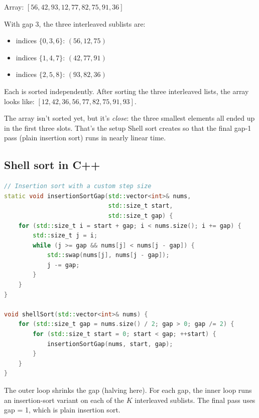 \documentclass[11pt]{article}
\begin{document}
\begin{examplebox}
Array: \quad $[56, 42, 93, 12, 77, 82, 75, 91, 36]$

With gap 3, the three interleaved sublists are:
\begin{itemize}[leftmargin=*]
  \item indices $\{0, 3, 6\}$: $(56, 12, 75)$
  \item indices $\{1, 4, 7\}$: $(42, 77, 91)$
  \item indices $\{2, 5, 8\}$: $(93, 82, 36)$
\end{itemize}
Each is sorted independently. After sorting the three interleaved
lists, the array looks like:
$[12, 42, 36, 56, 77, 82, 75, 91, 93]$.

The array isn't sorted yet, but it's \emph{close}: the three
smallest elements all ended up in the first three slots. That's the
setup Shell sort creates so that the final gap-1 pass (plain
insertion sort) runs in nearly linear time.
\end{examplebox}

\subsection{Shell sort in C++}

\begin{examplebox}
\begin{lstlisting}[basicstyle=\ttfamily\small,frame=single,language=C++]
// Insertion sort with a custom step size
static void insertionSortGap(std::vector<int>& nums,
                             std::size_t start,
                             std::size_t gap) {
    for (std::size_t i = start + gap; i < nums.size(); i += gap) {
        std::size_t j = i;
        while (j >= gap && nums[j] < nums[j - gap]) {
            std::swap(nums[j], nums[j - gap]);
            j -= gap;
        }
    }
}

void shellSort(std::vector<int>& nums) {
    for (std::size_t gap = nums.size() / 2; gap > 0; gap /= 2) {
        for (std::size_t start = 0; start < gap; ++start) {
            insertionSortGap(nums, start, gap);
        }
    }
}
\end{lstlisting}
The outer loop shrinks the gap (halving here). For each gap, the
inner loop runs an insertion-sort variant on each of the $K$
interleaved sublists. The final pass uses gap = 1, which is plain
insertion sort.
\end{examplebox}
\end{document}
